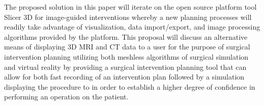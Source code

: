 The proposed solution in this paper will iterate on the open source platform tool Slicer 3D for image-guided interventions whereby a new planning processes will readily take advantage of visualization, data import/export, and image processing algorithms \cite{Ungi2016} provided by the platform. This proposal will discuss an alternative means of displaying 3D MRI and CT data to a user for the purpose of surgical intervention planning utilizing both meshless algorithms of surgical simulation and virtual reality by providing a surgical intervention planning tool that can allow for both fast recording of an intervention plan followed by a simulation displaying the procedure to in order to establish a higher degree of confidence in performing an operation on the patient.


